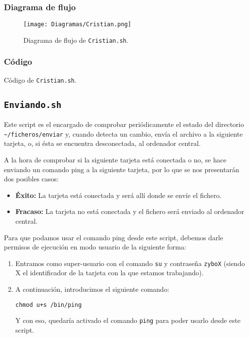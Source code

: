 \documentclass[12pt,letterpaper]{article}
\begin{document}
\newpage
\subsubsection{Diagrama de flujo}
\begin{figure}[h]
	\centering
	\texttt{[image: Diagramas/Cristian.png]}
	\caption{Diagrama de flujo de \texttt{Cristian.sh}.}
	\label{Diagrama de flujo de Cristian.sh}
\end{figure}

\newpage
\subsubsection{Código}

\begin{center}
	Código de \texttt{Cristian.sh}.
\end{center}

\newpage
\subsection{\texttt{Enviando.sh}}
Este script es el encargado de comprobar periódicamente el estado del directorio\\ \texttt{\textasciitilde/ficheros/enviar} y, cuando detecta un cambio, envía el archivo a la siguiente tarjeta, o, si ésta se encuentra desconectada, al ordenador central.

A la hora de comprobar si la siguiente tarjeta está conectada o no, se hace enviando un comando ping a la siguiente tarjeta, por lo que se nos presentarán dos posibles casos:
\begin{itemize}
	\item \textbf{Éxito:} La tarjeta está conectada y será allí donde se envíe el fichero.
	\item \textbf{Fracaso:} La tarjeta no está conectada y el fichero será enviado al ordenador central.
\end{itemize}

Para que podamos usar el comando ping desde este script, debemos darle permisos de ejecución en modo usuario de la siguiente forma:
\begin{enumerate}
	\item Entramos como super-usuario con el comando \texttt{su} y contraseña \texttt{zyboX} (siendo X el identificador de la tarjeta con la que estamos trabajando).
	\item A continuación, introducimos el siguiente comando:
	\begin{center}
		\texttt{chmod u+s /bin/ping}
	\end{center}
	Y con eso, quedaría activado el comando \texttt{ping} para poder usarlo desde este script.
\end{enumerate}
\end{document}
